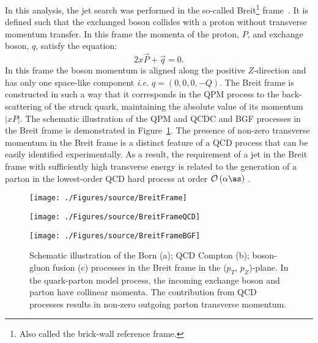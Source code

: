 In this analysis, the jet search was performed in the so-called Breit\footnote{Also called the brick-wall reference frame.} frame~\cite{feynman:1972:photon,zfp:c2:237}. It is defined such that the exchanged boson collides with a proton without transverse momentum transfer. In this frame the momenta of the proton, $P$, and exchange boson, $q$, satisfy the equation:
\begin{equation}
2x\vec{P} + \vec{q} = 0.
\label{eq:breitframe}
\end{equation}
In this frame the boson momentum is aligned along the positive $Z$-direction and has only one space-like component \textit{i.e.} $q=\left( 0, 0, 0, -Q\right)$. The Breit frame is constructed in such a way that it corresponds in the QPM process to the back-scattering of the struck quark, maintaining the absolute value of its momentum $\left|xP\right|$. The schematic illustration of the QPM and QCDC and BGF processes in the Breit frame is demonstrated in Figure~\ref{fig:breitframe}. The presence of non-zero transverse momentum in the Breit frame is a distinct feature of a QCD process that can be easily identified experimentally. As a result, the requirement of a jet in the Breit frame with sufficiently high transverse energy is related to the generation of a parton in the lowest-order QCD hard process at order $\mathcal{O}\left(\alpha\as\right)$ .
\begin{figure}
	\centering
	\begin{subfloat}[]{
		\texttt{[image: ./Figures/source/BreitFrame]}
		\label{fig:breitframeqpm}
	}%
	\end{subfloat}
	\begin{subfloat}[]{
		\texttt{[image: ./Figures/source/BreitFrameQCD]}
		\label{fig:breitframeqcd}
	}%
	\end{subfloat}
	\begin{subfloat}[]{
		\texttt{[image: ./Figures/source/BreitFrameBGF]}
		\label{fig:breitframeqcd}
	}%
	\end{subfloat}
	\caption{Schematic illustration of the Born (a); QCD Compton (b); boson-gluon fusion (c) processes in the Breit frame in the ($p_T$, $p_Z$)-plane. In the quark-parton model process, the incoming exchange boson and parton have collinear momenta. The contribution from QCD processes results in non-zero outgoing parton transverse momentum.}
\label{fig:breitframe}
\end{figure}